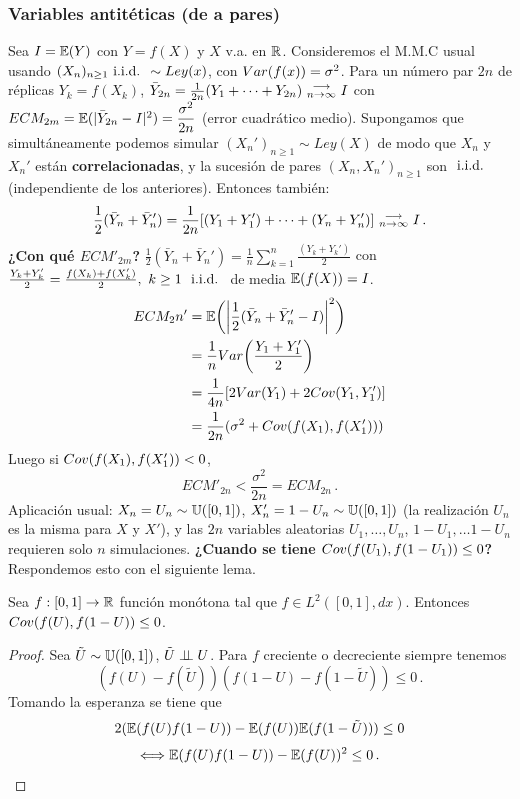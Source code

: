\subsubsection{Variables antitéticas (de a pares)}
\label{antitéticas}
Sea $I=\mathbb{E}(Y)$ con \hspace{.2cm} $Y=f(X)$ y \hspace{.2cm} $X$ v.a. en $\mathbb{R}$. Consideremos el M.M.C usual usando $(X_n)_{n\geq1}\mbox{ i.i.d. } \sim Ley(x)$, con $Var(f(x))=\sigma^2$. Para un número par $2n$ de réplicas $Y_k=f(X_k)$, $\bar{Y}_{2n}=\frac{1}{2n}(Y_1+\dots+Y_{2n})\mbox{ }\substack{\longrightarrow \\ n\to\infty}\mbox{ } I$ con $ECM_{2m}=\mathbb{E}(|\bar{Y}_{2n}-I|^2)=\displaystyle\frac{\sigma^2}{2n}$ (error cuadrático medio).
\newp Supongamos que simultáneamente podemos simular $(X_n')_{n\geq 1}\sim Ley(X)$ de modo que $X_n$ y $X_n'$ están \textbf{correlacionadas}, y la sucesión de pares $(X_n,X_n')_{n\geq1}$ son $\mbox{ i.i.d. }$ (independiente de los anteriores). Entonces también:
$$ \displaystyle\frac{1}{2}(\bar{Y}_n+\bar{Y}_n')=\frac{1}{2n}[(Y_1+Y_1')+\dots+(Y_n+Y_n')]\mbox{ }\substack{\longrightarrow \\ n\to\infty}\mbox{ } I\, .$$
\textbf{¿Con qué $ECM'_{2m}$?}
\newline $\displaystyle\frac{1}{2}(\bar{Y}_n+\bar{Y}_n')=\frac{1}{n}\sum^n_{k=1}\frac{(Y_k+Y_k')}{2}$ con $\frac{Y_k+Y_k'}{2}=\frac{f(X_k)+f(X_k')}{2},\mbox{ } k\geq1\mbox{ }\mbox{ i.i.d. }$ de media $\mathbb{E}(f(X))=I$.
\begin{alignat*}{2}
ECM_2n' & = \mathbb{E}\bigg(\bigg|\frac{1}{2}(\bar{Y}_n+\bar{Y}_n'-I)\bigg|^2\bigg) \\
& =\frac{1}{n}Var\bigg(\frac{Y_1+Y_1'}{2}\bigg) \\
& =\frac{1}{4n}[2Var(Y_1)+2Cov(Y_1,Y_1')] \\
& =\frac{1}{2n}(\sigma^2+Cov(f(X_1),f(X_1')))
\end{alignat*}
Luego si $Cov(f(X_1),f(X_1'))<0$, $$ECM'_{2n}<\frac{\sigma^2}{2n}=ECM_{2n} \, .$$
Aplicación usual: $X_n=U_n\sim\mathbb{U}([0,1])$, $X_n'=1-U_n\sim\mathbb{U}([0,1])$ (la realización $U_n$ es la misma para $X$ y $X'$), y las $2n$ variables aleatorias $U_1,\dots,U_n$, $1-U_1,\dots1-U_n$ requieren solo $n$ simulaciones.
\newp \textbf{¿Cuando se tiene $Cov(f(U_1),f(1-U_1))\leq 0$?}
Respondemos esto con el siguiente lema.
\begin{lemma}
Sea $f:[0,1]\to\mathbb{R}$ función monótona tal que $f\in L^2([0,1],dx)$. Entonces $Cov(f(U),f(1-U))\leq0$.
\end{lemma}
\begin{proof}  %
\gris
Sea $\tilde{U}\sim \mathbb{U}([0,1])$, $\tilde{U}\perp \!\!\! \perp U$. Para $f$ creciente o decreciente siempre tenemos
$$ (f(U)-f(\tilde{U}))(f(1-U)-f(1-\tilde{U})) \leq 0 \, .$$
Tomando la esperanza se tiene que
$$ 2(\mathbb{E}(f(U)f(1-U))-\mathbb{E}(f(U))\mathbb{E}(f(1-\tilde{U})))\leq 0 $$
$$ \Longleftrightarrow \mathbb{E}(f(U)f(1-U))-\mathbb{E}(f(U))^2 \leq 0 \, .$$
\findem
\negro
\end{proof}

